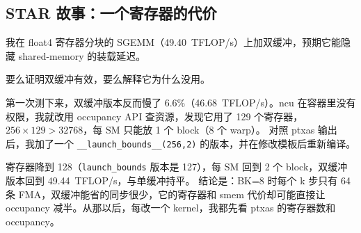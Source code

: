 \documentclass[11pt,a4paper]{ctexart}
\begin{document}
\subsection*{STAR 故事：一个寄存器的代价}
\begin{description}[leftmargin=1.5em]
  \item[Situation] 我在 float4 寄存器分块的 SGEMM（49.40~TFLOP/s）上加双缓冲，预期它能隐藏 shared-memory 的装载延迟。
  \item[Task] 要么证明双缓冲有效，要么解释它为什么没用。
  \item[Action] 第一次测下来，双缓冲版本反而慢了 6.6\%（46.68~TFLOP/s）。ncu 在容器里没有权限，我就改用 occupancy API 查资源，发现它用了 129 个寄存器，$256\times129>32768$，每 SM 只能放 1 个 block（8 个 warp）。
        对照 ptxas 输出后，我加了一个 \texttt{\_\_launch\_bounds\_\_(256,2)} 的版本，并在修改模板后重新编译。
  \item[Result] 寄存器降到 128（\texttt{launch\_bounds} 版本是 127），每 SM 回到 2 个 block，双缓冲版本回到 49.44~TFLOP/s，与单缓冲持平。
        结论是：BK=8 时每个 k 步只有 64 条 FMA，双缓冲能省的同步很少，它的寄存器和 smem 代价却可能直接让 occupancy 减半。从那以后，每改一个 kernel，我都先看 ptxas 的寄存器数和 occupancy。
\end{description}

\end{document}
